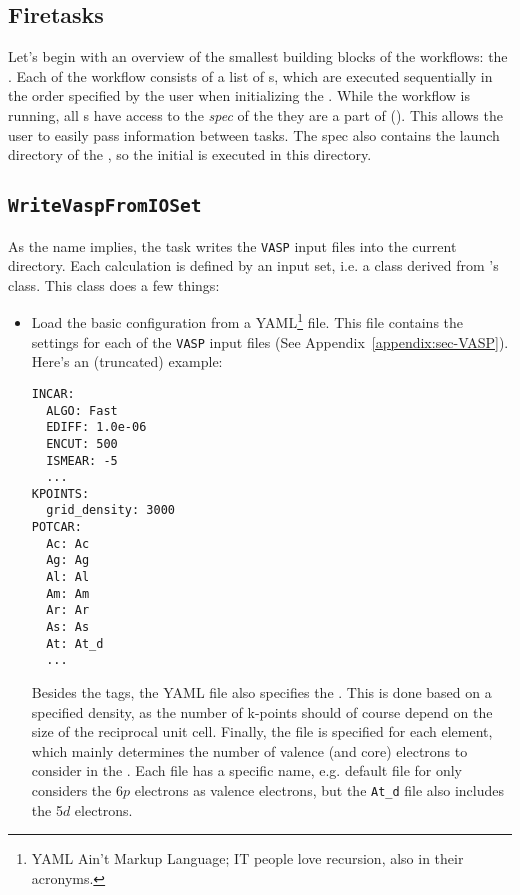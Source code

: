 \begin{refsection}
\section{Firetasks} \label{automation:sec-firetasks} 
 
Let's begin with an overview of the smallest building blocks of the workflows: 
the . Each  of the workflow consists of a list 
of s, which are executed sequentially in the order specified by 
the user when initializing the . While the workflow is 
running, all s have access to the \textit{spec} of the 
 they are a part of (). This allows the user 
to easily pass information between tasks. The spec also contains the launch 
directory of the , so the initial  is executed 
in this directory. 
 
\subsection{\texttt{WriteVaspFromIOSet}} 
\label{automation:sec-WriteVaspFromIOSet} 
 
As the name implies, the  task writes the 
\texttt{VASP} input files into the current directory. Each calculation is 
defined by an input set, i.e. a class derived from 's 
 class. This class does a few things: 
 
\begin{itemize} 
 
\item Load the basic configuration from a YAML\footnote{YAML Ain't Markup 
Language; IT people love recursion, also in their acronyms.} file. This file 
contains the settings for each of the \texttt{VASP} input files (See 
Appendix~\ref{appendix:sec-VASP}). Here's an (truncated) example: 
\begin{verbatim} 
INCAR: 
  ALGO: Fast 
  EDIFF: 1.0e-06 
  ENCUT: 500 
  ISMEAR: -5 
  ... 
KPOINTS: 
  grid_density: 3000 
POTCAR: 
  Ac: Ac 
  Ag: Ag 
  Al: Al 
  Am: Am 
  Ar: Ar 
  As: As 
  At: At_d 
  ... 
\end{verbatim} 
Besides the  tags, the YAML file also specifies the 
. This is done based on 
a specified density, as the number of k-points should of course depend on the 
size of the reciprocal unit cell. Finally, the  file is specified 
for each element, which mainly determines the number of valence (and core) 
electrons to consider in the . Each 
 file has a specific name, e.g. default file for  only 
considers the 6$p$ electrons as valence electrons, but the \texttt{At\_d} file 
also includes the 5$d$ electrons. 
 

\end{itemize}
\end{refsection}
